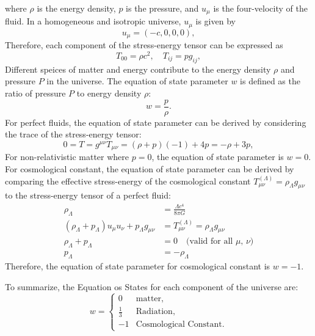 where \( \rho \) is the energy density, \( p \) is the pressure, and \( u_{\mu} \) is the four-velocity of the fluid.
In a homogeneous and isotropic universe, \( u_{\mu} \) is given by
\begin{equation}
    u_{\mu} = (-c, 0, 0, 0),
    \label{eq:four_velocity}
\end{equation}
Therefore, each component of the stress-energy tensor can be expressed as
\begin{equation}
    T_{00} = \rho c^2, \quad T_{ij} = p g_{ij},
    \label{eq:stress_energy_components}
\end{equation}
Different speices of matter and energy contribute to the energy density \( \rho \) and pressure \( P \) in the universe. The equation of state parameter \( w \) is defined as the ratio of pressure \( P \) to energy density \( \rho \):
\begin{equation}
    w = \frac{p}{\rho}.
    \label{eq:equation_of_state}
\end{equation}
For perfect fluids, the equation of state parameter can be derived by considering the trace of the stress-energy tensor:
\begin{equation}
    0 = T = g^{\mu\nu} T_{\mu\nu} = (\rho + p)(-1) + 4p = -\rho + 3p,
    \label{eq:stress_energy_trace}
\end{equation}
For non-relativistic matter where $p = 0$, the equation of state parameter is \( w = 0 \). 
For cosmological constant, the equation of state parameter can be derived by comparing the effective stress-energy of the cosmological constant $T_{\mu\nu}^{(\Lambda)} = \rho_{\Lambda} g_{\mu\nu}$ to the stress-energy tensor of a perfect fluid:
\begin{align}
    \rho_{\Lambda} &= \frac{\Lambda c^4}{8\pi G} \label{eq:lambda_density} \\
    \left(\rho_{\Lambda} + p_{\Lambda} \right) u_{\mu} u_{\nu} + p_{\Lambda} g_{\mu\nu} &= T_{\mu\nu}^{(\Lambda)} = \rho_{\Lambda} g_{\mu\nu}  \\
    \rho_{\Lambda} + p_{\Lambda} &= 0 \quad \text{(valid for all $\mu$, $\nu$)} \nonumber \\
    p_{\Lambda} &= -\rho_{\Lambda} \label{eq:lambda_pressure}
\end{align}
Therefore, the equation of state parameter for cosmological constant is \( w = -1 \).

To summarize, the Equation os States for each component of the universe are:
\begin{equation}
    w = 
    \begin{cases}
        0 & \text{matter}, \\
        \frac{1}{3} & \text{Radiation}, \\
        -1 & \text{Cosmological Constant}.
    \end{cases}
    \label{eq:equation_of_state_summary}
\end{equation}

